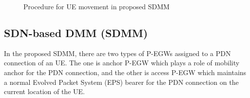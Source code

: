 \documentclass[runningheads,a4paper]{llncs}
\begin{document}
\begin{figure}[t] 
\centering 
{}
\vspace{-0.3cm}
\caption{Procedure for UE movement in proposed SDMM}
\label{fig:2}\vspace{-0.6cm}
\end{figure}

\subsection{SDN-based DMM (SDMM)}

In the proposed SDMM, there are two types of P-EGWs assigned to a PDN connection of an UE. The one is anchor P-EGW which plays a role of mobility anchor for the PDN connection, and the other is access P-EGW which maintains a normal Evolved Packet System (EPS) bearer for the PDN connection on the current location of the UE. 
\end{document}
